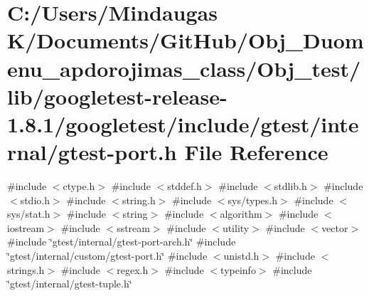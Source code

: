 \hypertarget{_obj__test_2lib_2googletest-release-1_88_81_2googletest_2include_2gtest_2internal_2gtest-port_8h}{}\section{C\+:/\+Users/\+Mindaugas K/\+Documents/\+Git\+Hub/\+Obj\+\_\+\+Duomenu\+\_\+apdorojimas\+\_\+class/\+Obj\+\_\+test/lib/googletest-\/release-\/1.8.1/googletest/include/gtest/internal/gtest-\/port.h File Reference}
\label{_obj__test_2lib_2googletest-release-1_88_81_2googletest_2include_2gtest_2internal_2gtest-port_8h}
{\ttfamily \#include $<$ctype.\+h$>$}\newline
{\ttfamily \#include $<$stddef.\+h$>$}\newline
{\ttfamily \#include $<$stdlib.\+h$>$}\newline
{\ttfamily \#include $<$stdio.\+h$>$}\newline
{\ttfamily \#include $<$string.\+h$>$}\newline
{\ttfamily \#include $<$sys/types.\+h$>$}\newline
{\ttfamily \#include $<$sys/stat.\+h$>$}\newline
{\ttfamily \#include $<$string$>$}\newline
{\ttfamily \#include $<$algorithm$>$}\newline
{\ttfamily \#include $<$iostream$>$}\newline
{\ttfamily \#include $<$sstream$>$}\newline
{\ttfamily \#include $<$utility$>$}\newline
{\ttfamily \#include $<$vector$>$}\newline
{\ttfamily \#include \char`\"{}gtest/internal/gtest-\/port-\/arch.\+h\char`\"{}}\newline
{\ttfamily \#include \char`\"{}gtest/internal/custom/gtest-\/port.\+h\char`\"{}}\newline
{\ttfamily \#include $<$unistd.\+h$>$}\newline
{\ttfamily \#include $<$strings.\+h$>$}\newline
{\ttfamily \#include $<$regex.\+h$>$}\newline
{\ttfamily \#include $<$typeinfo$>$}\newline
{\ttfamily \#include \char`\"{}gtest/internal/gtest-\/tuple.\+h\char`\"{}}\newline
